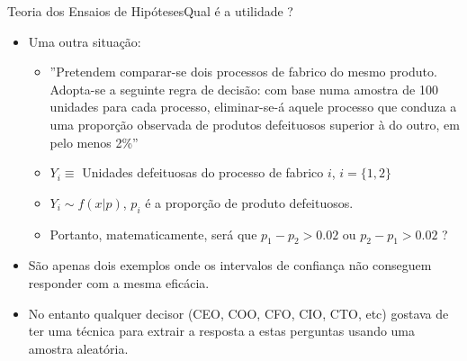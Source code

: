 \documentclass[10,5pt, pdf]{beamer}
\begin{document}
\begin{frame}{Teoria dos Ensaios de Hipóteses}{Qual é a utilidade ?}
\begin{itemize}
\item{Uma outra situação:}
\pause
\begin{itemize}
    \item{''Pretendem comparar-se dois processos de fabrico do mesmo produto.
Adopta-se a seguinte regra de decisão: com base numa amostra de 100
unidades para cada processo, eliminar-se-á aquele processo que conduza a uma proporção observada de produtos defeituosos superior à do outro, em pelo menos 2\%''}
\pause
\item{$Y_i\equiv$ Unidades defeituosas do processo de fabrico $i$, $i=\{1,2\}$}
\pause
\item{$Y_i \sim f(x|p)$, $p_i$ é a proporção de produto defeituosos.}
\pause
\item{Portanto, matematicamente, será que $p_1-p_2>0.02$ ou $p_2-p_1>0.02$ ?}
\end{itemize}
\pause
\item{São apenas dois exemplos onde os intervalos de confiança não conseguem responder com a mesma eficácia.}
\pause
\item{No entanto qualquer decisor (CEO, COO, CFO, CIO, CTO, etc) gostava de ter uma técnica para extrair a resposta a estas perguntas usando uma amostra aleatória.}
\end{itemize}
\end{frame}
\end{document}
